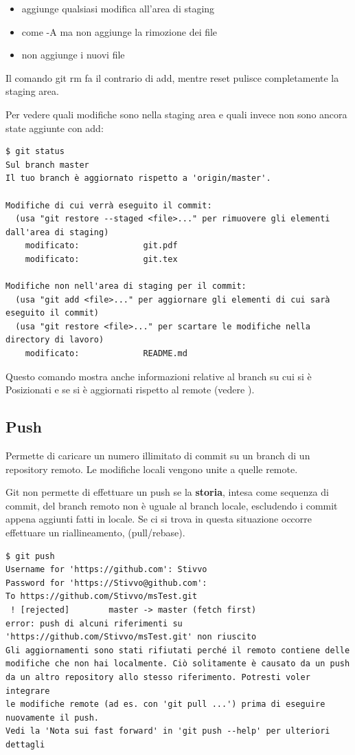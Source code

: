 \documentclass{article}
\begin{document}
\begin{itemize}
    \item {} aggiunge qualsiasi modifica all'area di staging
    \item {} come -A ma non aggiunge la rimozione dei file
    \item {} non aggiunge i nuovi file
\end{itemize}

Il comando git rm fa il contrario di add, mentre reset pulisce completamente la
staging area.

Per vedere quali modifiche sono nella staging area e quali invece non sono
ancora state aggiunte con add:

\begin{verbatim}
$ git status
Sul branch master
Il tuo branch è aggiornato rispetto a 'origin/master'.

Modifiche di cui verrà eseguito il commit:
  (usa "git restore --staged <file>..." per rimuovere gli elementi dall'area di staging)
	modificato:             git.pdf
	modificato:             git.tex

Modifiche non nell'area di staging per il commit:
  (usa "git add <file>..." per aggiornare gli elementi di cui sarà eseguito il commit)
  (usa "git restore <file>..." per scartare le modifiche nella directory di lavoro)
	modificato:             README.md
\end{verbatim}

Questo comando mostra anche informazioni relative al branch su cui si è
Posizionati e se si è aggiornati rispetto al remote (vedere ).

\subsection{Push\label{push}}
Permette di caricare un numero illimitato di commit su un branch di un
repository remoto. Le modifiche locali vengono unite a quelle remote.

Git non permette di effettuare un push se la \textbf{storia}, intesa come sequenza di commit,
del branch remoto non è uguale al branch locale, escludendo i commit
appena aggiunti fatti in locale. Se ci si trova in questa situazione occorre effettuare un riallineamento,
(pull/rebase).

\begin{verbatim}
$ git push
Username for 'https://github.com': Stivvo
Password for 'https://Stivvo@github.com':
To https://github.com/Stivvo/msTest.git
 ! [rejected]        master -> master (fetch first)
error: push di alcuni riferimenti su 'https://github.com/Stivvo/msTest.git' non riuscito
Gli aggiornamenti sono stati rifiutati perché il remoto contiene delle
modifiche che non hai localmente. Ciò solitamente è causato da un push
da un altro repository allo stesso riferimento. Potresti voler integrare
le modifiche remote (ad es. con 'git pull ...') prima di eseguire
nuovamente il push.
Vedi la 'Nota sui fast forward' in 'git push --help' per ulteriori
dettagli
\end{verbatim}
\end{document}
